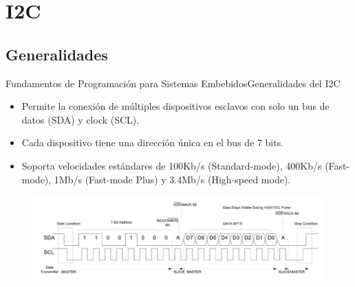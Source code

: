 \documentclass[aspectratio=169, xcolor=dvipsnames]{beamer}
\begin{document}
\section{I2C}
\subsection{Generalidades}
\begin{frame}{Fundamentos de Programación para Sistemas Embebidos}{Generalidades del I2C}
\begin{itemize}
    \item Permite la conexión de múltiples dispositivos esclavos con solo un bus de datos (SDA) y clock (SCL).
    \item Cada dispositivo tiene una dirección única en el bus de 7 bits.
    \item Soporta velocidades estándares de 100Kb/s (Standard-mode), 400Kb/s (Fast-mode), 1Mb/s (Fast-mode Plus) y 3.4Mb/s (High-speed mode).
\end{itemize}
\begin{figure}
\centering
\includegraphics[width=0.75\linewidth]{resources/images/i2c.png}
\end{figure}
\end{frame}
\end{document}
